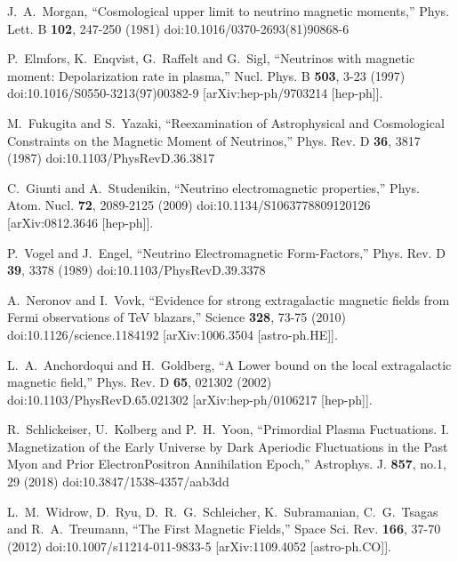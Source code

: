 \begin{thebibliography}{99}
J.~A.~Morgan,
``Cosmological upper limit to neutrino magnetic moments,''
Phys. Lett. B \textbf{102}, 247-250 (1981)
doi:10.1016/0370-2693(81)90868-6

P.~Elmfors, K.~Enqvist, G.~Raffelt and G.~Sigl,
``Neutrinos with magnetic moment: Depolarization rate in plasma,''
Nucl. Phys. B \textbf{503}, 3-23 (1997)
doi:10.1016/S0550-3213(97)00382-9
[arXiv:hep-ph/9703214 [hep-ph]].

M.~Fukugita and S.~Yazaki,
``Reexamination of Astrophysical and Cosmological Constraints on the Magnetic Moment of Neutrinos,''
Phys. Rev. D \textbf{36}, 3817 (1987)
doi:10.1103/PhysRevD.36.3817

C.~Giunti and A.~Studenikin,
``Neutrino electromagnetic properties,''
Phys. Atom. Nucl. \textbf{72}, 2089-2125 (2009)
doi:10.1134/S1063778809120126
[arXiv:0812.3646 [hep-ph]].


P.~Vogel and J.~Engel,
``Neutrino Electromagnetic Form-Factors,''
Phys. Rev. D \textbf{39}, 3378 (1989)
doi:10.1103/PhysRevD.39.3378

A.~Neronov and I.~Vovk,
``Evidence for strong extragalactic magnetic fields from Fermi observations of TeV blazars,''
Science \textbf{328}, 73-75 (2010)
doi:10.1126/science.1184192
[arXiv:1006.3504 [astro-ph.HE]].

L.~A.~Anchordoqui and H.~Goldberg,
``A Lower bound on the local extragalactic magnetic field,''
Phys. Rev. D \textbf{65}, 021302 (2002)
doi:10.1103/PhysRevD.65.021302
[arXiv:hep-ph/0106217 [hep-ph]].

R.~Schlickeiser, U.~Kolberg and P.~H.~Yoon,
``Primordial Plasma Fuctuations. I. Magnetization of the Early Universe by Dark Aperiodic Fluctuations in the Past Myon and Prior Electron\textendash{}Positron Annihilation Epoch,''
Astrophys. J. \textbf{857}, no.1, 29 (2018)
doi:10.3847/1538-4357/aab3dd

L.~M.~Widrow, D.~Ryu, D.~R.~G.~Schleicher, K.~Subramanian, C.~G.~Tsagas and R.~A.~Treumann,
``The First Magnetic Fields,''
Space Sci. Rev. \textbf{166}, 37-70 (2012)
doi:10.1007/s11214-011-9833-5
[arXiv:1109.4052 [astro-ph.CO]].


\end{thebibliography}
